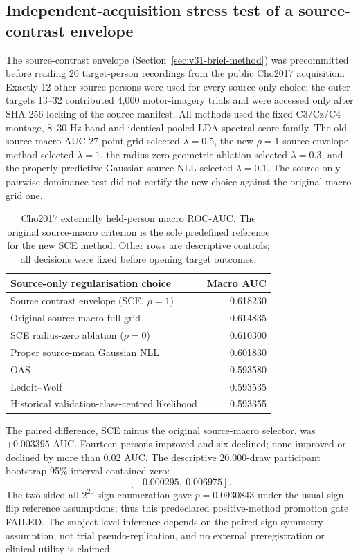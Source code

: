 \subsection{Independent-acquisition stress test of a source-contrast envelope}
\label{sec:v31-cho}
The source-contrast envelope (Section~\ref{sec:v31-brief-method})
was precommitted before reading 20 target-person recordings from
the public Cho2017 acquisition. Exactly 12 other source persons
were used for every source-only choice; the outer targets
13--32 contributed 4,000 motor-imagery trials and were accessed
only after SHA-256 locking of the source manifest.
All methods used the fixed C3/Cz/C4 montage, 8--30 Hz band
and identical pooled-LDA spectral score family.
The old source macro-AUC 27-point grid selected $\lambda=0.5$,
the new $\rho=1$ source-envelope method selected $\lambda=1$,
the radius-zero geometric ablation selected $\lambda=0.3$,
and the properly predictive Gaussian source NLL selected $\lambda=0.1$.
The source-only pairwise dominance test did not certify
the new choice against the original macro-grid one.

\begin{table}[ht]
\centering
\small
\caption{Cho2017 externally held-person macro ROC-AUC.
The original source-macro criterion is the sole predefined
reference for the new SCE method. Other rows are descriptive controls;
all decisions were fixed before opening target outcomes.}
\label{tab:v31-cho}
\begin{tabular}{lr}
\toprule
Source-only regularisation choice & Macro AUC\\
\midrule
Source contrast envelope (SCE, $\rho=1$) & 0.618230\\
Original source-macro full grid & 0.614835\\
SCE radius-zero ablation ($\rho=0$) & 0.610300\\
Proper source-mean Gaussian NLL & 0.601830\\
OAS & 0.593580\\
Ledoit--Wolf & 0.593535\\
Historical validation-class-centred likelihood & 0.593355\\
\bottomrule
\end{tabular}
\end{table}
The paired difference, SCE minus the original source-macro
selector, was $+0.003395$ AUC. Fourteen persons improved and
six declined; none improved or declined by more than 0.02 AUC.
The descriptive 20,000-draw participant bootstrap 95\% interval
contained zero:
\[
[-0.000295,\ 0.006975].
\]
The two-sided all-$2^{20}$-sign enumeration gave
$p=0.0930843$ under the usual sign-flip reference assumptions;
thus this predeclared positive-method promotion gate FAILED.
The subject-level inference depends on the paired-sign symmetry
assumption, not trial pseudo-replication, and no external
preregistration or clinical utility is claimed.

